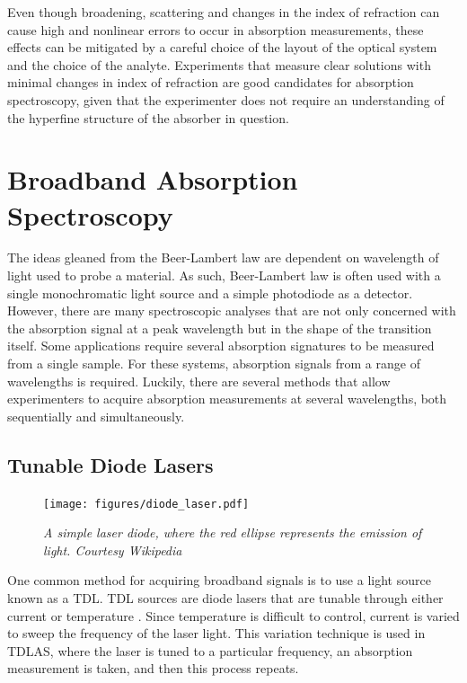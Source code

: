 Even though broadening, scattering and changes in the index of refraction can
cause high and nonlinear errors to occur in absorption measurements, these
effects can be mitigated by a careful choice of the layout of the optical
system and the choice of the analyte. Experiments that measure clear solutions
with minimal changes in index of refraction are good candidates for absorption
spectroscopy, given that the experimenter does not require an understanding of
the hyperfine structure of the absorber in question.



\section{Broadband Absorption Spectroscopy}\label{sec:broad_abs}

The ideas gleaned from the Beer-Lambert law are dependent on wavelength of
light used to probe a material. As such, Beer-Lambert law is often used with a
single monochromatic light source and a simple photodiode as a detector.
However, there are many spectroscopic analyses that are not only concerned with
the absorption signal at a peak wavelength but in the shape of the transition
itself. Some applications require several absorption signatures to be measured
from a single sample. For these systems, absorption signals from a range of
wavelengths is required. Luckily, there are several methods that allow
experimenters to acquire absorption measurements at several wavelengths, both
sequentially and simultaneously.



\subsection{Tunable Diode Lasers}\label{subsec:tdl}

\begin{figure}
\begin{center}
\texttt{[image: figures/diode\_laser.pdf]}
\end{center}
\emph{\footnotesize{A simple laser diode, where the red ellipse represents the emission of light. Courtesy Wikipedia}}
\end{figure}

One common method for acquiring broadband signals is to use a light source
known as a \acf{TDL}. \ac{TDL} sources are diode lasers that are tunable
through either current or temperature \cite{May:1998ue}. Since temperature is
difficult to control, current is varied to sweep the frequency of the laser
light. This variation technique is used in \ac{TDLAS}, where the laser is
tuned to a particular frequency, an absorption measurement is taken, and then
this process repeats.

